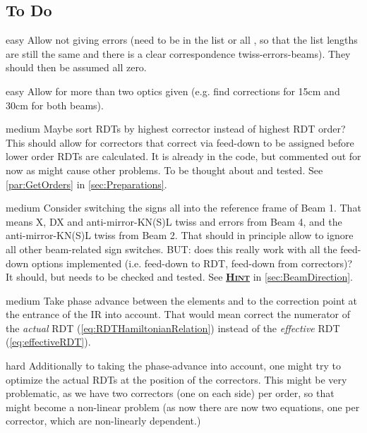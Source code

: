 \subsection{To Do}
\label{sec:Todo}
\begin{important}
 \item[\color{AtlasGreen}easy] Allow not giving errors 
   (need to be  in the list or all , 
   so that the list lengths are still the same and there is a
   clear correspondence twiss-errors-beams).
   They should then be assumed all zero.
 \item[\color{AtlasGreen}easy] Allow for more than two optics given
   (e.g. find corrections for 15cm and 30cm for both beams).
 \item[\color{AtlasOrange}medium] 
   Maybe sort RDTs by highest corrector instead of highest RDT order?
   This should allow for correctors that correct via feed-down
   to be assigned before lower order RDTs are calculated.
   It is already in the code, but commented out for now as
   might cause other problems. To be thought about and tested.
   See \cref{par:GetOrders} in \cref{sec:Preparations}.
 \item[\color{AtlasOrange}medium] 
   Consider switching the signs all into the reference frame of Beam 1.
   That means X, DX and anti-mirror-KN(S)L twiss and errors from Beam 4,
   and the anti-mirror-KN(S)L twiss from Beam 2.
   That should in principle allow to ignore all other beam-related sign switches.
   BUT: does this really work with all the feed-down options implemented
   (i.e. feed-down to RDT, feed-down from correctors)?
   It should, but needs to be checked and tested.
   See \hyperlink{Hint:SwitchBeamSigns}{\textcolor{AtlasGreen}{\textsc{\bfseries Hint}}} in \cref{sec:BeamDirection}.
 \item[\color{AtlasOrange}medium]
   Take phase advance between the elements and to the correction point at the entrance of the IR into account.
   That would mean correct the numerator of the \textit{actual} RDT (\cref{eq:RDTHamiltonianRelation}) instead 
   of the \textit{effective} RDT (\cref{eq:effectiveRDT}).
 \item[\color{CernRed}hard]
   Additionally to taking the phase-advance into account, one might try to optimize the actual RDTs at the position of the correctors.
   This might be very problematic, as we have two correctors (one on each side)
   per order, so that might become a non-linear problem (as now there
   are now two equations, one per corrector, which are non-linearly dependent.)
\end{important}
